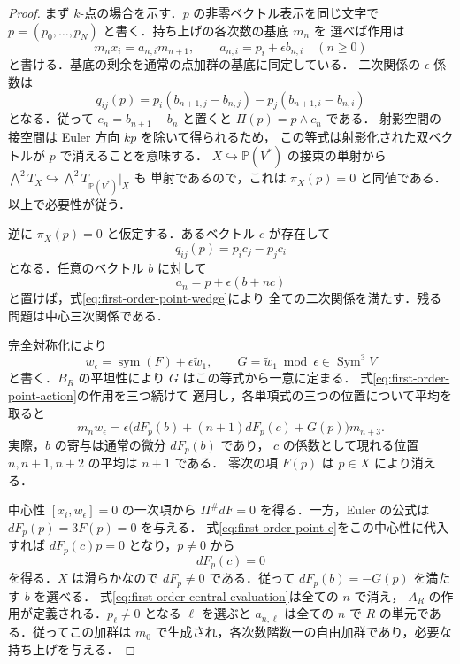 \begin{proof}
まず $k$-点の場合を示す．$p$ の非零ベクトル表示を同じ文字で
$p=(p_0,\ldots,p_N)$ と書く．持ち上げの各次数の基底 $m_n$ を
選べば作用は
\[
 m_nx_i=a_{n,i}m_{n+1},\qquad
 a_{n,i}=p_i+\epsilon b_{n,i}
 \quad(n\geq0)
\]
と書ける．基底の剰余を通常の点加群の基底に同定している．
二次関係の $\epsilon$ 係数は
\begin{equation}\label{eq:first-order-point-wedge}
 q_{ij}(p)=p_i(b_{n+1,j}-b_{n,j})
                -p_j(b_{n+1,i}-b_{n,i})
\end{equation}
となる．従って $c_n=b_{n+1}-b_n$ と置くと
$\Pi(p)=p\wedge c_n$ である．
射影空間の接空間は Euler 方向 $kp$ を除いて得られるため，
この等式は射影化された双ベクトルが $p$ で消えることを意味する．
$X\hookrightarrow\mathbb P(V^*)$ の接束の単射から
$\bigwedge^2T_X\hookrightarrow\bigwedge^2T_{\mathbb P(V^*)}|_X$ も
単射であるので，これは $\pi_X(p)=0$ と同値である．
以上で必要性が従う．

逆に $\pi_X(p)=0$ と仮定する．あるベクトル $c$ が存在して
\begin{equation}\label{eq:first-order-point-c}
 q_{ij}(p)=p_ic_j-p_jc_i
\end{equation}
となる．任意のベクトル $b$ に対して
\begin{equation}\label{eq:first-order-point-action}
 a_n=p+\epsilon(b+nc)
\end{equation}
と置けば，式\eqref{eq:first-order-point-wedge}により
全ての二次関係を満たす．残る問題は中心三次関係である．

完全対称化により
\[
 w_\epsilon=\operatorname{sym}(F)+\epsilon\widetilde w_1,
 \qquad G=\widetilde w_1\bmod\epsilon\in\operatorname{Sym}^3V
\]
と書く．$B_R$ の平坦性により $G$ はこの等式から一意に定まる．
式\eqref{eq:first-order-point-action}の作用を三つ続けて
適用し，各単項式の三つの位置について平均を取ると
\begin{equation}\label{eq:first-order-central-evaluation}
 m_nw_\epsilon=
 \epsilon\bigl(dF_p(b)+(n+1)dF_p(c)+G(p)\bigr)m_{n+3}.
\end{equation}
実際，$b$ の寄与は通常の微分 $dF_p(b)$ であり，
$c$ の係数として現れる位置 $n,n+1,n+2$ の平均は $n+1$ である．
零次の項 $F(p)$ は $p\in X$ により消える．

中心性 $[x_i,w_\epsilon]=0$ の一次項から
$\Pi^\#dF=0$ を得る．一方，Euler の公式は
$dF_p(p)=3F(p)=0$ を与える．
式\eqref{eq:first-order-point-c}をこの中心性に代入すれば
$dF_p(c)p=0$ となり，$p\neq0$ から
\[
 dF_p(c)=0
\]
を得る．$X$ は滑らかなので $dF_p\neq0$ である．従って
$dF_p(b)=-G(p)$ を満たす $b$ を選べる．
式\eqref{eq:first-order-central-evaluation}は全ての $n$ で消え，
$A_R$ の作用が定義される．$p_\ell\neq0$ となる $\ell$ を選ぶと
$a_{n,\ell}$ は全ての $n$ で $R$ の単元である．従ってこの加群は
$m_0$ で生成され，各次数階数一の自由加群であり，必要な持ち上げを与える．


\end{proof}
